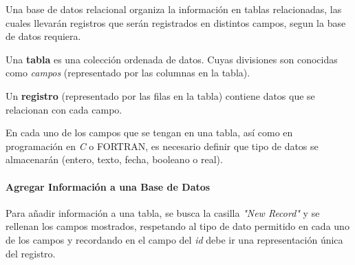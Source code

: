 Una base de datos relacional organiza la información en tablas relacionadas, las cuales llevarán registros que serán registrados en distintos campos, segun la base de datos requiera.
\vspace{0.5cm}
\begin{definicion}
	Una \textbf{tabla} es una colección ordenada de datos. Cuyas divisiones son conocidas como \textit{campos} (representado por las columnas en la tabla).
\end{definicion}

\vspace{0.5cm}
\begin{definicion}
	Un \textbf{registro} (representado por las filas en la tabla) contiene datos que se relacionan con cada campo.
\end{definicion}

En cada uno de los campos que se tengan en una tabla, así como en programación en \textit{C} o FORTRAN, es necesario definir que tipo de datos se almacenarán (entero, texto, fecha, booleano o real).

\paragraph{Agregar Información a una Base de Datos}

Para añadir información a una tabla, se busca la casilla \textit{"New Record"} y se rellenan los campos mostrados, respetando al tipo de dato permitido en cada uno de los campos y recordando en el campo del \textit{id} debe ir una representación única del registro.


